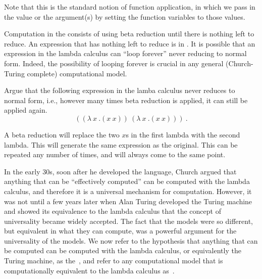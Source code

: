 \begin{flex}
\label{grp:grm:lambda-calculus::standard}

\begin{gram}
\label{grm:lambda-calculus::standard}
Note that this is the standard notion of function application, in
which we pass in the value or the argument(s) by setting the function variables
to those values.

Computation in the \lc{} consists of 
using beta reduction until there is nothing left to reduce.  
An expression that has nothing left to reduce is in .
It is possible that an expression in the lambda calculus can ``loop
forever'' never reducing to normal form.   Indeed, the possibility of
looping forever is crucial in any general (Church-Turing complete) computational model.

\end{gram}

\begin{exercise}
\label{xrcs:lambda-calculus::argue}
Argue that the following expression in the lamba calculus never
reduces to normal form, i.e., however many times beta reduction is
applied, it can still be applied again.
\[ ((\lambda~x~.(x~x))~(\lambda~x~.(x~x)))~.\]

\end{exercise}

\begin{solution}
\label{sol:lambda-calculus::beta}
A beta reduction will replace the two $x$s in the first lambda with
the second lambda.    This will generate the same expression as the
original.   This can be repeated any number of times, and will always
come to the same point.

\end{solution}
\end{flex}

\begin{cluster}
\label{grp:grm:lambda-calculus::church-turing-hypothesis}

\begin{gram}
\label{grm:lambda-calculus::church-turing-hypothesis}
In the early 30s, soon after he developed the language, Church argued that anything that can be ``effectively
computed'' can be computed with the lambda calculus, and therefore
it is a universal mechanism for computation.  
However, it was not until a few years later when Alan Turing developed
the Turing machine and showed its equivalence to the lambda calculus
that the concept of universality became widely accepted.  The fact
that the models were so different, but equivalent in what they can
compute, was a powerful argument for the universality of the models.
We now refer to the hypothesis that anything that can be computed can
be computed with the lambda calculus, or equivalently the Turing
machine, as the~, and refer to any
computational model that is computationally equivalent to the lambda
calculus as~.

\end{gram}
\end{cluster}


